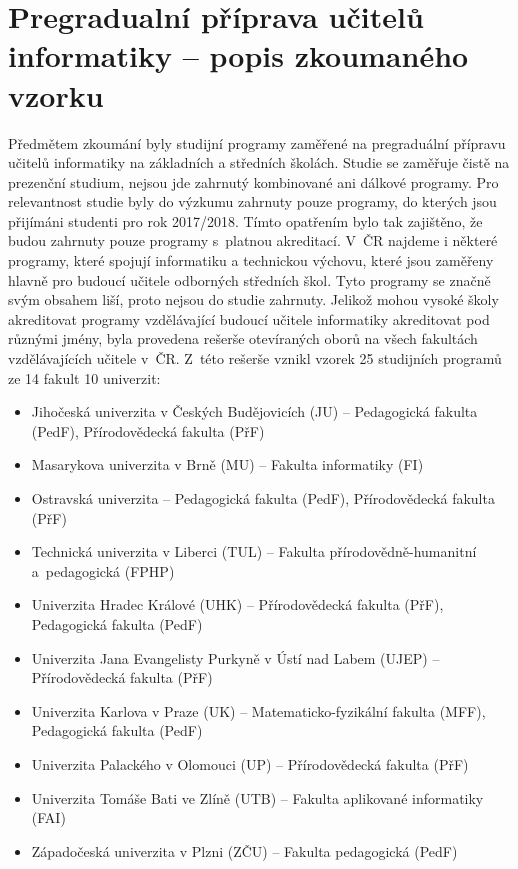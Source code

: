 \documentclass[FP,DP]{tulthesis}
\begin{document}
{{{{{{{\section{Pregradualní příprava učitelů informatiky -- popis zkoumaného vzorku}
Předmětem zkoumání byly studijní programy zaměřené na pregraduální přípravu učitelů informatiky na základních a středních školách. Studie se zaměřuje čistě na prezenční studium, nejsou jde zahrnutý kombinované ani dálkové programy. Pro relevantnost studie byly do výzkumu zahrnuty pouze programy, do kterých jsou přijímáni studenti pro rok 2017/2018. Tímto opatřením bylo tak zajištěno, že budou zahrnuty pouze programy s~platnou akreditací. V~ČR najdeme i některé programy, které spojují informatiku a technickou výchovu, které jsou zaměřeny hlavně pro budoucí učitele odborných středních škol. Tyto programy se značně svým obsahem liší, proto nejsou do studie zahrnuty.
Jelikož mohou vysoké školy akreditovat programy vzdělávající budoucí učitele informatiky akreditovat pod různými jmény, byla provedena rešerše otevíraných oborů na všech fakultách vzdělávajících učitele v~ČR. Z~této rešerše vznikl vzorek 25 studijních programů ze 14 fakult 10 univerzit:
\begin{itemize}
\setlength\itemsep{0.2em}
\item Jihočeská univerzita v Českých Budějovicích (JU) -- Pedagogická fakulta (PedF), Přírodovědecká fakulta (PřF)
\item Masarykova univerzita v Brně (MU) -- Fakulta informatiky (FI)
\item Ostravská univerzita -- Pedagogická fakulta (PedF), Přírodovědecká fakulta (PřF)
\item Technická univerzita v Liberci (TUL) -- Fakulta 	přírodovědně-humanitní a~pedagogická (FPHP)
\item Univerzita Hradec Králové (UHK) -- Přírodovědecká fakulta (PřF), Pedagogická fakulta (PedF)
\item Univerzita Jana Evangelisty Purkyně v Ústí nad Labem (UJEP) -- Přírodovědecká fakulta (PřF)
\item Univerzita Karlova v Praze (UK) -- Matematicko-fyzikální fakulta (MFF), Pedagogická fakulta (PedF)
\item Univerzita Palackého v Olomouci (UP) -- Přírodovědecká fakulta (PřF)
\item Univerzita Tomáše Bati ve Zlíně (UTB) -- Fakulta aplikované informatiky (FAI)
\item Západočeská univerzita v Plzni (ZČU) -- Fakulta pedagogická (PedF)

\end{itemize}}}}}}}}
\end{document}
